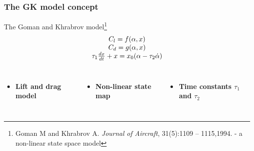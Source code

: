 \documentclass[compress]{beamer}
\begin{document}
\begin{frame}
  \frametitle{The GK model concept}
  The Goman and Khrabrov model\footnote{\tiny{Goman M and Khrabrov A. \emph{Journal of Aircraft}, 31(5):1109 – 1115,1994. - a non-linear state space model}}
  \begin{equation*}
    \begin{array}[c]{c}
      C_l= f(\alpha,x) \\
      C_d= g(\alpha,x) \\
      \tau_1 \frac{dx}{dt} +x = x_0(\alpha - \tau_2 \dot{\alpha}) 
    \end{array}
  \end{equation*}

  \begin{columns}[t] 
    \begin{itemize}
      \item   \textbf{Lift and drag model}
    \end{itemize}
    \begin{itemize}
      \item    \textbf{Non-linear state map}
    \end{itemize}
    \begin{itemize}
      \item \textbf{Time constants $\tau_1$ and $\tau_2$} 
    \end{itemize}
  \end{columns}


\end{frame}
\end{document}
